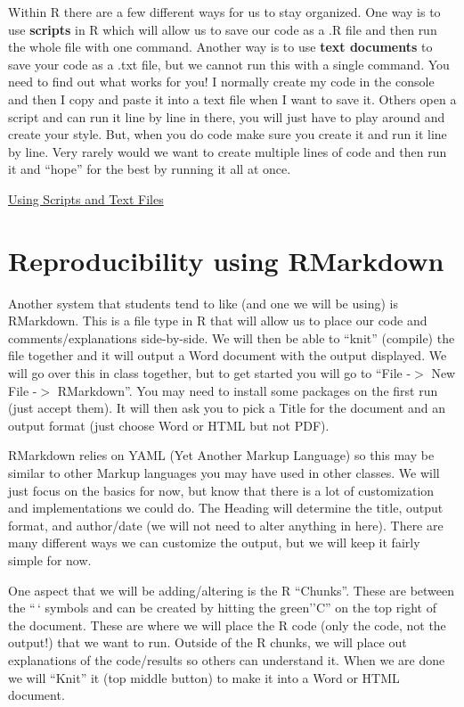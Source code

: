 \documentclass[
  letterpaper,
  DIV=11,
  numbers=noendperiod]{scrreprt}
\begin{document}
Within R there are a few different ways for us to stay organized. One
way is to use \textbf{scripts} in R which will allow us to save our code
as a .R file and then run the whole file with one command. Another way
is to use \textbf{text documents} to save your code as a .txt file, but
we cannot run this with a single command. You need to find out what
works for you! I normally create my code in the console and then I copy
and paste it into a text file when I want to save it. Others open a
script and can run it line by line in there, you will just have to play
around and create your style. But, when you do code make sure you create
it and run it line by line. Very rarely would we want to create multiple
lines of code and then run it and ``hope'' for the best by running it
all at once.

\begin{watch}{}{}
    \href{https://youtu.be/wwTJtW4s7yU}{Using Scripts and Text Files}
\end{watch}

\section{Reproducibility using
RMarkdown}\label{reproducibility-using-rmarkdown}

Another system that students tend to like (and one we will be using) is
RMarkdown. This is a file type in R that will allow us to place our code
and comments/explanations side-by-side. We will then be able to ``knit''
(compile) the file together and it will output a Word document with the
output displayed. We will go over this in class together, but to get
started you will go to ``File -\(>\) New File -\(>\) RMarkdown''. You
may need to install some packages on the first run (just accept them).
It will then ask you to pick a Title for the document and an output
format (just choose Word or HTML but not PDF).

RMarkdown relies on YAML (Yet Another Markup Language) so this may be
similar to other Markup languages you may have used in other classes. We
will just focus on the basics for now, but know that there is a lot of
customization and implementations we could do. The Heading will
determine the title, output format, and author/date (we will not need to
alter anything in here). There are many different ways we can customize
the output, but we will keep it fairly simple for now.

One aspect that we will be adding/altering is the R ``Chunks''. These
are between the ``\,` symbols and can be created by hitting the
green''C'' on the top right of the document. These are where we will
place the R code (only the code, not the output!) that we want to run.
Outside of the R chunks, we will place out explanations of the
code/results so others can understand it. When we are done we will
``Knit'' it (top middle button) to make it into a Word or HTML document.
\end{document}
